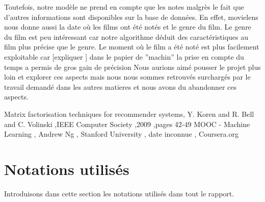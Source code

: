 \documentclass[a4paper,10pt]{article}
\begin{document}
Toutefois, notre modèle ne prend en compte que les notes malgrès le fait que d'autres informations sont disponibles sur la base de données.
En effet, movielens nous donne aussi la date où les films ont été notés et le genre du film.
Le genre du film est peu intéressant car notre algorithme déduit des caractéristiques au film plus précise que le genre.%
Le moment où le film a été noté est plus facilement exploitable car [expliquer ] dans le papier de ''machin'' la prise en compte  du temps a
permis de gros gain de précision%
Nous aurions aimé pousser le projet plus loin et explorer ces aspects 
mais nous nous sommes retrouvés surchargés par le travail demandé dans les autres matieres et nous avons du abandonner ces aspects.



\newpage 
 
\begin{thebibliography}{99} 
 Matrix factorisation techniques for recommender systems, Y. Koren and R. Bell and C. Volinski ,IEEE Computer Society ,2009 ,pages 42-49 
 MOOC - Machine Learning , Andrew Ng , Stanford University , date inconnue , Coursera.org
\end{thebibliography}

\newpage





\appendix
\section{Notations utilisés}
\label{notations}

Introduisons dans cette section les notations utilisés dans tout le rapport.\\ 
\end{document}
